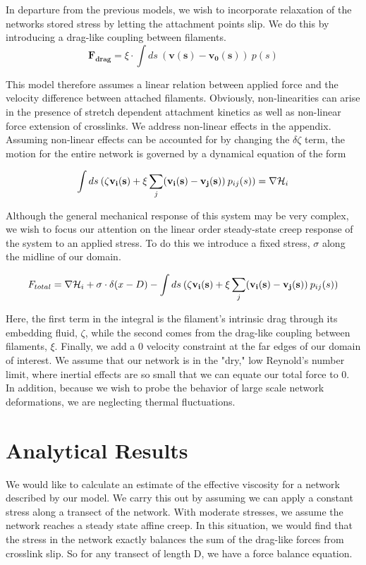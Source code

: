 \documentclass[prb,11pt]{revtex4-1}
\begin{document}
In departure from the previous models, we wish to incorporate relaxation of the networks stored stress by letting the attachment points slip.  We do this by introducing a drag-like coupling between filaments.
\begin{equation}
\mathbf{F_{drag}} = \xi \cdot \int ds \: (\mathbf{v(s)}-\mathbf{v_0(s)}) \: p(s)
\end{equation}

This model therefore assumes a linear relation between applied force and the velocity difference between attached filaments.  Obviously, non-linearities can arise in the presence of stretch dependent attachment kinetics as well as non-linear force extension of crosslinks.  We address non-linear effects in the appendix.  Assuming non-linear effects can be accounted for by changing the $\delta \zeta$ term, the motion for the entire network is governed by a dynamical equation of the form

\begin{equation}
\int ds \: (\mathbf{\zeta v_i(s)} + \xi \sum _j(\mathbf{v_i(s)}-\mathbf{v_j(s)}) \: p_{ij}(s))= \nabla {\cal H}_i
\end{equation}

Although the general mechanical response of this system may be very complex, we wish to focus our attention on the linear order steady-state creep response of the system to an applied stress.  To do this we introduce a fixed stress, $\sigma$ along the midline of our domain.

\begin{equation}
F_{total}= \nabla {\cal H}_i + \sigma\cdot\delta(x-D)- \int ds \: (\zeta\mathbf{v_i(s)} + \xi \sum _j(\mathbf{v_i(s)}-\mathbf{v_j(s)}) \: p_{ij}(s)) 
\end{equation}

Here, the first term in the integral is the filament's intrinsic drag through its embedding fluid, $\zeta$, while the second comes from the drag-like coupling between filaments, $\xi$.  Finally, we add a 0 velocity constraint at the far edges of our domain of interest.  We assume that our network is in the "dry," low Reynold's number limit, where inertial effects are so small that we can equate our total force to 0.  In addition, because we wish to probe the behavior of large scale network deformations, we are neglecting thermal fluctuations.  

\section{Analytical Results}
We would like to calculate an estimate of the effective viscosity for a network described by our model.  We carry this out by assuming we can apply a constant stress along a transect of the network.  With moderate stresses, we assume the network reaches a steady state affine creep. In this situation, we would find that the stress in the network exactly balances the sum of the drag-like forces from crosslink slip.  So for any transect of length D, we have a force balance equation.
\end{document}

